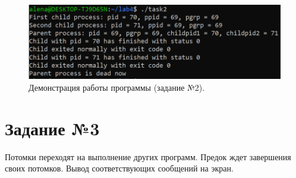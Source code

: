 \documentclass[12pt]{report}
\begin{document}
\begin{figure}[H]

	\centering

	\includegraphics[width=\linewidth]{img/task02.png}
	\caption{Демонстрация работы программы (задание №2).}

	\label{fig:task02}

\end{figure}

\section*{Задание №3}

Потомки переходят на выполнение других программ. Предок ждет завершения своих потомков. Вывод соответствующих сообщений на экран.
\end{document}
